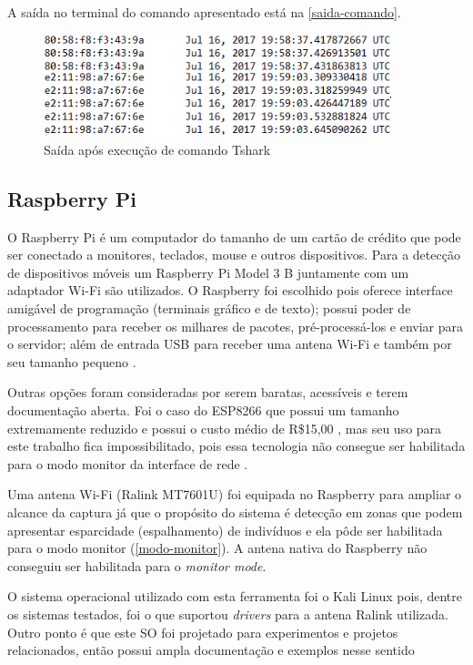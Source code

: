 A saída no terminal do comando apresentado está na \autoref{saida-comando}.

\begin{figure}[htb]
  \caption{\label{saida-comando}Saída após execução de comando Tshark}
  \begin{center}
    \includegraphics[width=0.90\textwidth]{img/packets.png}
  \end{center}
\end{figure}

\subsection{Raspberry Pi}
O Raspberry Pi é um computador do tamanho de um cartão de crédito que pode ser conectado a monitores, teclados, mouse e outros dispositivos.
Para a detecção de dispositivos móveis um Raspberry Pi Model 3 B juntamente com um adaptador Wi-Fi são utilizados. O Raspberry foi escolhido
pois oferece interface amigável de programação (terminais gráfico e de texto); possui poder de processamento para receber os milhares de pacotes, pré-processá-los
e enviar para o servidor; além de entrada USB para receber uma antena Wi-Fi e também por seu tamanho pequeno \cite{rpi2017}.

Outras opções foram consideradas por serem baratas, acessíveis e terem documentação aberta. Foi o caso do ESP8266 que possui um tamanho extremamente
reduzido e possui o custo médio de R\$15,00 \cite{Embarcados2015}, mas seu uso para este trabalho fica impossibilitado, pois essa tecnologia não consegue ser habilitada para o modo monitor da interface de rede \cite{Puhl2016} \cite{Ferreira2016}.

Uma antena Wi-Fi (Ralink MT7601U) foi equipada no Raspberry para ampliar o alcance da captura já que o propósito do sistema é detecção em zonas que podem
apresentar esparcidade (espalhamento) de indivíduos e ela pôde ser habilitada para o modo monitor (\autoref{modo-monitor}). A antena nativa
do Raspberry não conseguiu ser habilitada para o \emph{monitor mode}.

O sistema operacional utilizado com esta ferramenta foi o Kali Linux pois, dentre os sistemas testados, foi o que suportou \emph{drivers} para a antena Ralink utilizada. Outro ponto é que este SO foi projetado para experimentos e projetos relacionados, então possui ampla documentação e exemplos nesse sentido \cite{kali}

